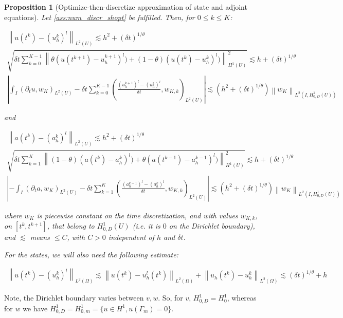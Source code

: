 \documentclass[english,a4paper,9pt,oneside]{scrbook}	%
\theoremstyle{break}
\newtheorem{prop}[equation]{Proposition}
\theoremstyle{remark}
\newcommand{\norm}[1]{\left\lVert#1\right\rVert}
\newcommand{\te}{\theta}
\begin{document}
\begin{prop}[Optimize-then-discretize approximation of state and adjoint equations]
\label{prop:o-t-d}
Let \cref{ass:num_discr_shopt} be fulfilled. Then, for $0\leq k \leq K$:

\begin{align*}
	\norm{u(t^k)-(u_h^k)^l}_{L^2(U)}\lesssim  h^2 + (\delta t)^{1/\theta}\\
	\sqrt{\delta t \sum_{k=0}^{K-1} \norm{\theta(u(t^{k+1}) - u_h^{k+1})^l) + (1-\theta)(u(t^{k}) - u_h^{k})^l)}_{H^1(U)}^2} \lesssim h + (\delta t)^{1/\theta}\\
	\left | \int_I (\partial_t u , w_K)_{L^2(U)}-\delta t \sum_{k=0}^{K-1}\left ( \frac{(u^{k+1}_h)^l - (u_h^k)^l}{\delta t} , w_{K,k}\right )_{L^2(U)} \right |\lesssim \left ( h^2 + (\delta t)^{1/\theta} \right ) \norm{w_K}_{L^2(I,H^1_{0,D}(U))}
\end{align*}

and

\begin{align*}
	\norm{a(t^k)-(a_h^k)^l}_{L^2(U)}\lesssim  h^2 + (\delta t)^{1/\theta}\\
	\sqrt{\delta t \sum_{k=1}^{K} \norm{(1-\theta)(a(t^{k}) - a_h^{k})^l) + \theta(a(t^{k-1}) - a_h^{k-1})^l)}_{H^1(U)}^2} \lesssim h + (\delta t)^{1/\theta}\\
	\left |- \int_I (\partial_t a , w_K)_{L^2(U)}-\delta t \sum_{k=1}^{K}\left ( \frac{(a^{k-1}_h)^l - (a_h^{k})^l}{\delta t} , w_{K,k}\right )_{L^2(U)} \right |\lesssim \left ( h^2 + (\delta t)^{1/\theta} \right ) \norm{w_K}_{L^2(I,H^1_{0,D}(U))}
\end{align*}

where $w_K$ is piecewise constant on the time discretization, and with values $w_{K,k}$, on $[t^k,t^{k+1}]$, that belong to $H^1_{0,D}(U)$ (i.e. it is $0$ on the Dirichlet boundary), and $\lesssim$ means $\leq C$, with $C> 0$ independent of $h$ and $\delta t$.

For the states, we will also need the following estimate:

\begin{align*}
\norm{u(t^k)-(u_h^k)^l}_{L^2(\Omega)}\lesssim  \norm{u(t^k)-u_h^l(t^k)}_{L^2(\Omega)}+ \norm{u_h(t^k)-u_h^k}_{L^2(\Omega)}\lesssim (\delta t)^{1/\te} + h
\end{align*}

\end{prop}

Note, the Dirichlet boundary varies between $v,w$. So, for $v$, $H^1_{0,D}=H^1_0$, whereas for $w$ we have $H^1_{0,D}=H^1_{0,m}=\{u \in H^1, u(\Gamma_m)=0\}$.
\end{document}
